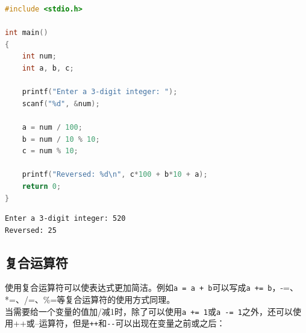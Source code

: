 
\begin{lstlisting}[language=C]
#include <stdio.h>

int main()
{
	int num;
	int a, b, c;

	printf("Enter a 3-digit integer: ");
	scanf("%d", &num);

	a = num / 100;
	b = num / 10 % 10;
	c = num % 10;

	printf("Reversed: %d\n", c*100 + b*10 + a);
	return 0;
}
\end{lstlisting}

\begin{tcolorbox}
	\begin{verbatim}
Enter a 3-digit integer: 520
Reversed: 25
	\end{verbatim}
\end{tcolorbox}

\vspace{0.5cm}

\subsection{复合运算符}

使用复合运算符可以使表达式更加简洁。例如\lstinline|a = a + b|可以写成\lstinline|a += b|，-=、*=、/=、\%=等复合运算符的使用方式同理。\\

当需要给一个变量的值加/减1时，除了可以使用\lstinline|a += 1|或\lstinline|a -= 1|之外，还可以使用++或--运算符，但是\lstinline|++|和\lstinline|--|可以出现在变量之前或之后：\\

\begin{table}[H]
	\centering
	\caption{自增/自减运算符}
\end{table}


